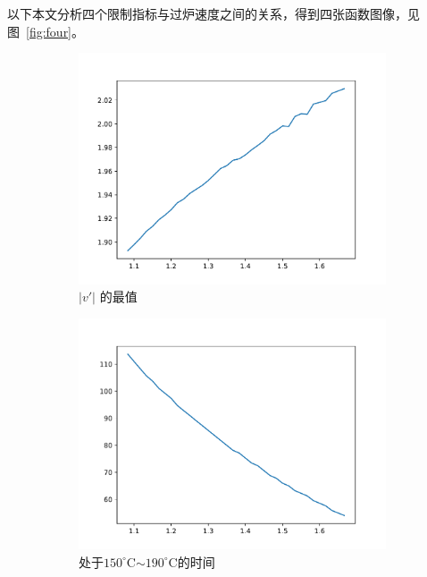 \documentclass[../main.tex]{subfiles}
\begin{document}
以下本文分析四个限制指标与过炉速度之间的关系，得到四张函数图像，见图~\ref{fig:four}。
\begin{figure}[H]
\centering
	\begin{subfigure}[b]{0.4\textwidth}
		\centering
		\includegraphics[width=\textwidth]{k.pdf}
		\caption{\(\vert v' \vert\) 的最值}
	\end{subfigure}
	\begin{subfigure}[b]{0.4\textwidth}
		\centering
		\includegraphics[width=\textwidth]{190170.pdf}
		\caption{处于\(150 ^{\circ}\mathrm{C}\)\(\sim\)\(190 ^{\circ}\mathrm{C}\)的时间}
	\end{subfigure}
	\begin{subfigure}[b]{0.4\textwidth}

\end{subfigure}
\end{figure}
\end{document}
